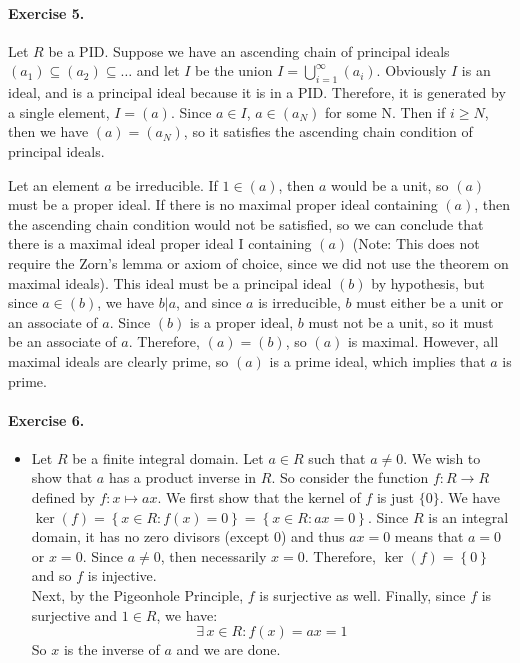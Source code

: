 \documentclass[12pt,a4paper]{report}
\theoremstyle{definition}
\theoremstyle{num.custom-title}
\begin{document}
\paragraph{Exercise 5.} Let $R$ be a PID. Suppose we have an ascending chain of principal ideals $(a_1)\subseteq(a_2)\subseteq \ldots$ and let $I$ be the union $I=\bigcup_{i=1}^\infty (a_i)$. Obviously $I$ is an ideal, and is a principal ideal because it is in a PID. Therefore, it is generated by a single element, $I=(a)$. Since $a \in I$, $a\in (a_N)$ for some N. Then if $i\geq N$, then we have $(a)=(a_N)$, so it satisfies the ascending chain condition of principal ideals.

Let an element $a$ be irreducible. If $1\in (a)$, then $a$ would be a unit, so $(a)$ must be a proper ideal. If there is no maximal proper ideal containing $(a)$, then the ascending chain condition would not be satisfied, so we can conclude that there is a maximal ideal proper ideal I containing $(a)$ (Note: This does not require the Zorn's lemma or axiom of choice, since we did not use the theorem on maximal ideals). This ideal must be a principal ideal $(b)$ by hypothesis, but since $a\in (b)$, we have $b|a$, and since $a$ is irreducible, $b$ must either be a unit or an associate of $a$. Since $(b)$ is a proper ideal, $b$ must not be a unit, so it must be an associate of $a$. Therefore, $(a)=(b)$, so $(a)$ is maximal. However, all maximal ideals are clearly prime, so $(a)$ is a prime ideal, which implies that $a$ is prime.

\paragraph{Exercise 6.}
\begin{itemize}
\item Let $R$ be a finite integral domain. Let $a \in R$ such that $a \ne 0$. We wish to show that $a$ has a product inverse in $R$. So consider the function $f: R \to R$ defined by $f: x \mapsto a x$. We first show that the kernel of $f$ is just $\{0\}$. We have $\ker \left({f}\right) = \left\{{x \in R: f \left({x}\right) = 0}\right\} = \left\{{x \in R: a x = 0}\right\}$. Since $R$ is an integral domain, it has no zero divisors (except $0$) and thus $a x = 0$ means that $a = 0$ or $x = 0$. Since $a \ne 0$, then necessarily $x = 0$. Therefore, $\ker \left({f}\right) = \left\{{0}\right\}$ and so $f$ is injective.\\
Next, by the Pigeonhole Principle, $f$ is surjective as well. Finally, since $f$ is surjective and $1 \in R$, we have:
\[
\exists \, x \in R: f \left({x}\right) = a x = 1
\]
So $x$ is the inverse of $a$ and we are done.
\end{itemize}
\end{document}
